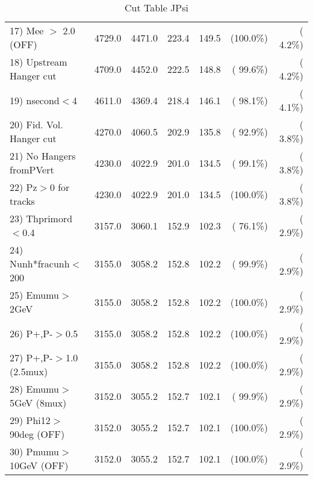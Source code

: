 \begin{table}[h!]
\begin{tabular}{||l||r|r|r|r|r|r||}
 17) Mee $>$ 2.0  (OFF)   &       4729.0 &       4471.0 &        223.4 &        149.5 & (100.0\%) & (  4.2\%) \\
 18) Upstream Hanger cut  &       4709.0 &       4452.0 &        222.5 &        148.8 & ( 99.6\%) & (  4.2\%) \\
 19) nsecond$<$4          &       4611.0 &       4369.4 &        218.4 &        146.1 & ( 98.1\%) & (  4.1\%) \\
 20) Fid. Vol. Hanger cut &       4270.0 &       4060.5 &        202.9 &        135.8 & ( 92.9\%) & (  3.8\%) \\
 21) No Hangers fromPVert &       4230.0 &       4022.9 &        201.0 &        134.5 & ( 99.1\%) & (  3.8\%) \\
 22) Pz$>$0 for tracks    &       4230.0 &       4022.9 &        201.0 &        134.5 & (100.0\%) & (  3.8\%) \\
 23) Thprimord$<$0.4      &       3157.0 &       3060.1 &        152.9 &        102.3 & ( 76.1\%) & (  2.9\%) \\
 24) Nunh*fracunh$<$200   &       3155.0 &       3058.2 &        152.8 &        102.2 & ( 99.9\%) & (  2.9\%) \\
 25) Emumu$>$2GeV         &       3155.0 &       3058.2 &        152.8 &        102.2 & (100.0\%) & (  2.9\%) \\
 26) P+,P-$>$0.5          &       3155.0 &       3058.2 &        152.8 &        102.2 & (100.0\%) & (  2.9\%) \\
 27) P+,P-$>$1.0 (2.5mux) &       3155.0 &       3058.2 &        152.8 &        102.2 & (100.0\%) & (  2.9\%) \\
 28) Emumu$>$5GeV  (8mux) &       3152.0 &       3055.2 &        152.7 &        102.1 & ( 99.9\%) & (  2.9\%) \\
 29) Phi12$>$90deg  (OFF) &       3152.0 &       3055.2 &        152.7 &        102.1 & (100.0\%) & (  2.9\%) \\
 30) Pmumu$>$10GeV  (OFF) &       3152.0 &       3055.2 &        152.7 &        102.1 & (100.0\%) & (  2.9\%) \\
 \hline
 \hline
 \end{tabular}
 \caption{Cut Table  JPsi     }
 \label{tab-cutcohjpsi-mumu_cohrhop}
 \end{table}
